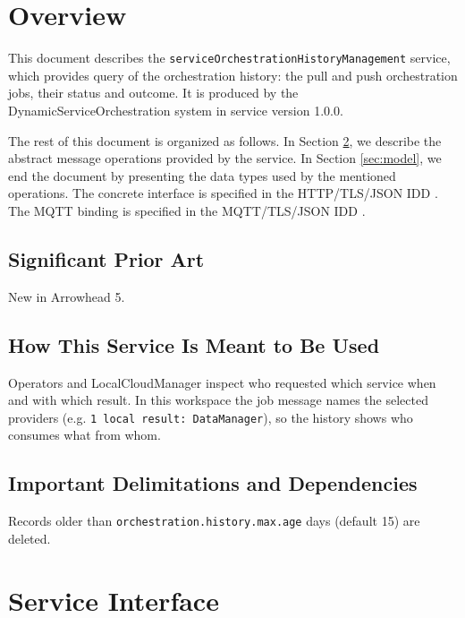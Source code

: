 \documentclass[a4paper]{arrowhead}
\begin{document}
\section{Overview}
\label{sec:overview}

This document describes the \texttt{service\allowbreak{}Orchestration\allowbreak{}History\allowbreak{}Management} service, which provides query of the orchestration history: the pull and push orchestration jobs, their status and outcome.
It is produced by the DynamicServiceOrchestration system \cite{dso-sysd} in service version 1.0.0.

The rest of this document is organized as follows.
In Section \ref{sec:operations}, we describe the abstract message operations provided by the service.
In Section \ref{sec:model}, we end the document by presenting the data types used by the mentioned operations.
The concrete interface is specified in the HTTP/TLS/JSON IDD \cite{dso-serviceOrchestrationHistoryManagement-http-idd}. The MQTT binding is specified in the MQTT/TLS/JSON IDD \cite{dso-serviceOrchestrationHistoryManagement-mqtt-idd}.

\subsection{Significant Prior Art}

New in Arrowhead 5.

\subsection{How This Service Is Meant to Be Used}

Operators and LocalCloudManager inspect who requested which service when and with which result. In this workspace the job message names the selected providers (e.g. \texttt{1 local result: Data\allowbreak{}Manager}), so the history shows who consumes what from whom.

\subsection{Important Delimitations and Dependencies}
\label{sec:delimitations}

Records older than \texttt{orchestration.\allowbreak{}history.\allowbreak{}max.\allowbreak{}age} days (default 15) are deleted.

\newpage

\section{Service Interface}
\label{sec:operations}
\end{document}
